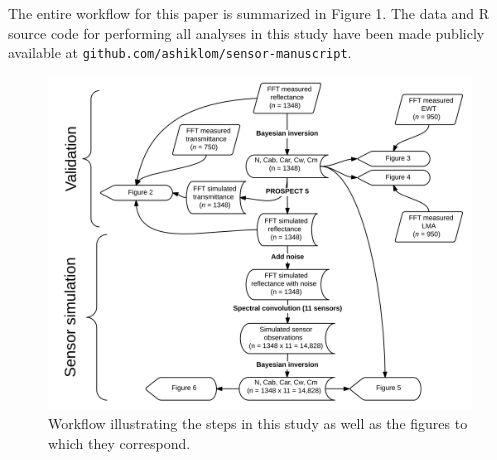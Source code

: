 The entire workflow for this paper is summarized in Figure 1. %
The data and R source code for performing all analyses in this study have been made publicly available at \texttt{github.com/ashiklom/sensor-manuscript}.

\begin{figure}
  \centering
  \includegraphics[width=\textwidth]{2_rtm_inversion/figures/workflow.png}
  \caption{%
    Workflow illustrating the steps in this study as well as the figures to which they correspond.
  }\label{fig:pecanrtm-workflow}
\end{figure}
